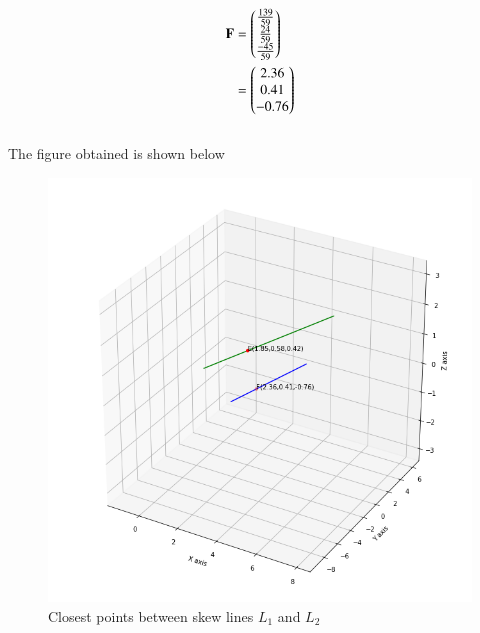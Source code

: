 \documentclass[journal,12pt,twocolumn]{IEEEtran}
\begin{document}
\begin{align}
    \mathbf{F} & = \begin{pmatrix}\frac{139}{59} \\ \frac{24}{59}
    \\ \frac{-45}{59}\end{pmatrix}
    \\&=\begin{pmatrix}2.36 \\ 0.41 \\ -0.76\end{pmatrix}
\end{align}
\\
The figure obtained is shown below
\renewcommand{\thefigure}{1}
\begin{figure}[h!]
    \centering
    \includegraphics[width=\columnwidth]{closest.png}
    \caption{Closest points between skew lines $L_1$ and $L_2$}
    \label{myfig}
\end{figure}
\end{document}
